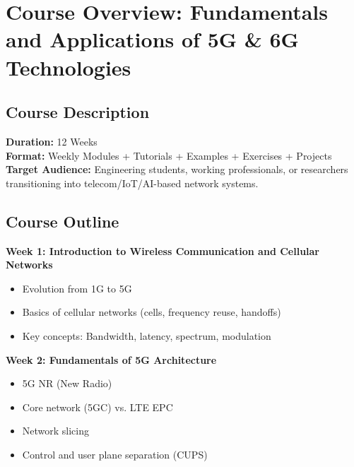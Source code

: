 
\chapter{Course Overview: Fundamentals and Applications of 5G \& 6G Technologies}

\section*{\faBook\hspace{0.5em} Course Description}

\textbf{Duration:} 12 Weeks \\
\textbf{Format:} Weekly Modules + Tutorials + Examples + Exercises + Projects \\
\textbf{Target Audience:} Engineering students, working professionals, or researchers transitioning into telecom/IoT/AI-based network systems.

\vspace{1em}

\section*{\faListAlt\hspace{0.5em} Course Outline}

\noindent
\faChevronCircleRight\hspace{0.5em} \textbf{Week 1: Introduction to Wireless Communication and Cellular Networks}
\begin{itemize}
    \item Evolution from 1G to 5G
    \item Basics of cellular networks (cells, frequency reuse, handoffs)
    \item Key concepts: Bandwidth, latency, spectrum, modulation
\end{itemize}

\noindent
\faChevronCircleRight\hspace{0.5em} \textbf{Week 2: Fundamentals of 5G Architecture}
\begin{itemize}
    \item 5G NR (New Radio)
    \item Core network (5GC) vs. LTE EPC
    \item Network slicing
    \item Control and user plane separation (CUPS)
\end{itemize}

